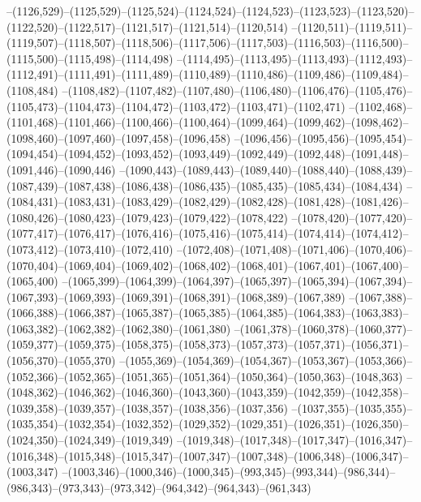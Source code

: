 --(1126,529)--(1125,529)--(1125,524)--(1124,524)--(1124,523)--(1123,523)--(1123,520)--(1122,520)--(1122,517)--(1121,517)--(1121,514)--(1120,514)
--(1120,511)--(1119,511)--(1119,507)--(1118,507)--(1118,506)--(1117,506)--(1117,503)--(1116,503)--(1116,500)--(1115,500)--(1115,498)--(1114,498)
--(1114,495)--(1113,495)--(1113,493)--(1112,493)--(1112,491)--(1111,491)--(1111,489)--(1110,489)--(1110,486)--(1109,486)--(1109,484)--(1108,484)
--(1108,482)--(1107,482)--(1107,480)--(1106,480)--(1106,476)--(1105,476)--(1105,473)--(1104,473)--(1104,472)--(1103,472)--(1103,471)--(1102,471)
--(1102,468)--(1101,468)--(1101,466)--(1100,466)--(1100,464)--(1099,464)--(1099,462)--(1098,462)--(1098,460)--(1097,460)--(1097,458)--(1096,458)
--(1096,456)--(1095,456)--(1095,454)--(1094,454)--(1094,452)--(1093,452)--(1093,449)--(1092,449)--(1092,448)--(1091,448)--(1091,446)--(1090,446)
--(1090,443)--(1089,443)--(1089,440)--(1088,440)--(1088,439)--(1087,439)--(1087,438)--(1086,438)--(1086,435)--(1085,435)--(1085,434)--(1084,434)
--(1084,431)--(1083,431)--(1083,429)--(1082,429)--(1082,428)--(1081,428)--(1081,426)--(1080,426)--(1080,423)--(1079,423)--(1079,422)--(1078,422)
--(1078,420)--(1077,420)--(1077,417)--(1076,417)--(1076,416)--(1075,416)--(1075,414)--(1074,414)--(1074,412)--(1073,412)--(1073,410)--(1072,410)
--(1072,408)--(1071,408)--(1071,406)--(1070,406)--(1070,404)--(1069,404)--(1069,402)--(1068,402)--(1068,401)--(1067,401)--(1067,400)--(1065,400)
--(1065,399)--(1064,399)--(1064,397)--(1065,397)--(1065,394)--(1067,394)--(1067,393)--(1069,393)--(1069,391)--(1068,391)--(1068,389)--(1067,389)
--(1067,388)--(1066,388)--(1066,387)--(1065,387)--(1065,385)--(1064,385)--(1064,383)--(1063,383)--(1063,382)--(1062,382)--(1062,380)--(1061,380)
--(1061,378)--(1060,378)--(1060,377)--(1059,377)--(1059,375)--(1058,375)--(1058,373)--(1057,373)--(1057,371)--(1056,371)--(1056,370)--(1055,370)
--(1055,369)--(1054,369)--(1054,367)--(1053,367)--(1053,366)--(1052,366)--(1052,365)--(1051,365)--(1051,364)--(1050,364)--(1050,363)--(1048,363)
--(1048,362)--(1046,362)--(1046,360)--(1043,360)--(1043,359)--(1042,359)--(1042,358)--(1039,358)--(1039,357)--(1038,357)--(1038,356)--(1037,356)
--(1037,355)--(1035,355)--(1035,354)--(1032,354)--(1032,352)--(1029,352)--(1029,351)--(1026,351)--(1026,350)--(1024,350)--(1024,349)--(1019,349)
--(1019,348)--(1017,348)--(1017,347)--(1016,347)--(1016,348)--(1015,348)--(1015,347)--(1007,347)--(1007,348)--(1006,348)--(1006,347)--(1003,347)
--(1003,346)--(1000,346)--(1000,345)--(993,345)--(993,344)--(986,344)--(986,343)--(973,343)--(973,342)--(964,342)--(964,343)--(961,343)
